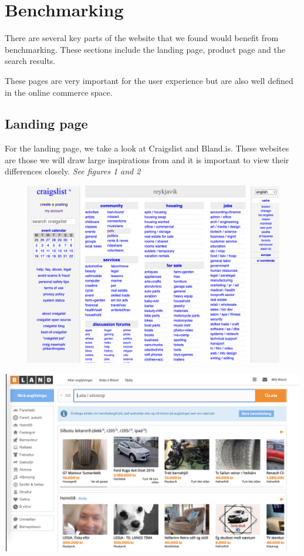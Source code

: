 \section{Benchmarking}
There are several key parts of the website that we found would benefit from benchmarking. These sections include the landing page, product page and the search results. 

These pages are very important for the user experience but are also well defined in the online commerce space. 
\subsection{Landing page}
For the landing page, we take a look at Craigslist and Bland.is.
These websites are those we will draw large inspirations from and it is important to view their differences closely. \textit{See figures 1 and 2}

\begin{Figure}
    \begin{center}
        \includegraphics[width=150mm, height=80mm]{Images/benchmarking/landing_page_cl.png}
    \end{center}
\end{Figure}
\begin{Figure}
    \begin{center}
        \includegraphics[width=150mm, height=80mm]{Images/benchmarking/landing_page_bland.png}
    \end{center}
\end{Figure}

